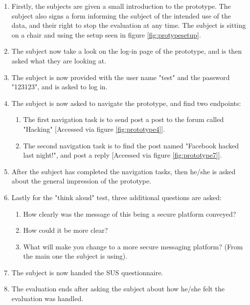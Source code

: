 \begin{mdframed}[linewidth=0pt,backgroundcolor=lightgray!20,innertopmargin = 0.5cm,innerbottommargin = 0.5cm]
    \begin{enumerate}
        \item Firstly, the subjects are given a small introduction to the prototype. The subject also signs a form informing the subject of the intended use of the data, and their right to stop the evaluation at any time. The subject is sitting on a chair and using the setup seen in figure \ref{fig:protypesetup}.
        \item The subject now take a look on the log-in page of the prototype, and is then asked what they are looking at.
        \item The subject is now provided with the user name "test" and the password "123123", and is asked to log in.
        \item The subject is now asked to navigate the prototype, and find two endpoints:
        \begin{enumerate}
            \item The first navigation task is to send post a post to the forum called "Hacking" [Accessed via figure \ref{fig:prototype4}].
            \item The second navigation task is to find the post named "Facebook hacked last night!", and post a reply [Accessed via figure \ref{fig:prototype7}].
        \end{enumerate}
        \item After the subject has completed the navigation tasks, then he/she is asked about the general impression of the prototype.
        \item Lastly for the "think aloud" test, three additional questions are asked:
        \begin{enumerate}
            \item How clearly was the message of this being a secure platform conveyed?
            \item How could it be more clear?
            \item What will make you change to a more secure messaging platform? (From the main one the subject is using).
        \end{enumerate}
        \item The subject is now handed the SUS questionnaire.
        \item The evaluation ends after asking the subject about how he/she felt the evaluation was handled.
    \end{enumerate}
\end{mdframed}

